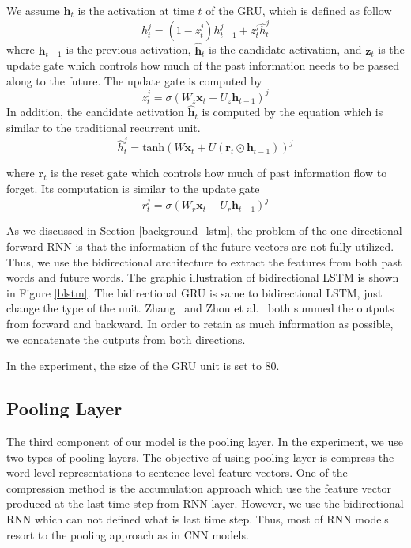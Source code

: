 We assume $\mathbf{h}_t$ is the activation at time $t$ of the GRU, which is defined as follow
\begin{equation}
h_t^j = (1-z_t^j) h_{t-1}^j + z_t^j \hat{h}_t^j
\end{equation}
where $\mathbf{h}_{t-1}$ is the previous activation, $\hat{\mathbf{h}}_t$ is the candidate activation, and $\mathbf{z}_t$ is the update gate which controls how much of the past information needs to be passed along to the future. The update gate is computed by 
\begin{equation}
z_t^j = \sigma(W_z \mathbf{x}_t + U_z \mathbf{h}_{t-1})^j 
\end{equation}
In addition, the candidate activation $\hat{\mathbf{h}}_t$ is computed by the equation which is similar to the traditional recurrent unit. 
\begin{equation}
\hat{h}_t^j = \mbox{tanh}(W \mathbf{x}_t + U(\mathbf{r}_t \odot \mathbf{h}_{t-1}))^j
\end{equation}

where $\mathbf{r}_t$ is the reset gate which controls how much of past information flow to forget. Its computation is similar to the update gate 
\begin{equation}
r_t^j = \sigma(W_r \mathbf{x}_t + U_r \mathbf{h}_{t-1})^j
\end{equation}

As we discussed in Section \ref{background_lstm}, the problem of the one-directional forward RNN is that the information of the future vectors are not fully utilized. Thus, we use the bidirectional architecture to extract the features from both past words and future words. The graphic illustration of bidirectional LSTM is shown in Figure \ref{blstm}. The bidirectional GRU is same to bidirectional LSTM, just change the type of the unit. Zhang~\cite{zhang2015relation} and Zhou et al.~\cite{zhou2016attention} both summed the outputs from forward and backward. In order to retain as much information as possible, we concatenate the outputs from both directions. 

In the experiment, the  size of the GRU unit is set to 80. 

\subsection{Pooling Layer}
The third component of our model is the pooling layer. In the experiment, we use two types of pooling layers. The objective of using pooling layer is compress the word-level representations to sentence-level feature vectors. One of the compression method is the accumulation approach which use the feature vector produced at the last time step from RNN layer. However, we use the bidirectional RNN which can not defined what is last time step. Thus, most of RNN models resort to the pooling approach as in CNN models. 

